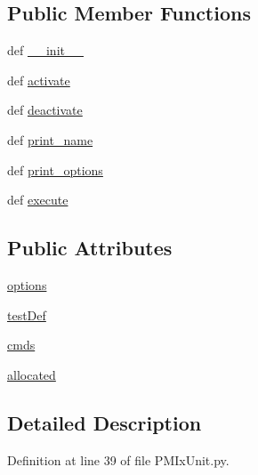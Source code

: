 \subsection*{Public Member Functions}
\begin{DoxyCompactItemize}
\item 
def \hyperlink{class_p_m_ix_unit_1_1_p_m_ix_unit_a01b0f667b854dc0d7051c071d01f2cdb}{\-\_\-\-\_\-init\-\_\-\-\_\-}
\item 
def \hyperlink{class_p_m_ix_unit_1_1_p_m_ix_unit_af9eb3845f804e5cff57f0b96a5c1d912}{activate}
\item 
def \hyperlink{class_p_m_ix_unit_1_1_p_m_ix_unit_a77590898cef9e5d560857e25a00ee287}{deactivate}
\item 
def \hyperlink{class_p_m_ix_unit_1_1_p_m_ix_unit_a64943a4530694aa835f021d0442fc8dd}{print\-\_\-name}
\item 
def \hyperlink{class_p_m_ix_unit_1_1_p_m_ix_unit_a716d70327c8f43718a74e99e87eb05e1}{print\-\_\-options}
\item 
def \hyperlink{class_p_m_ix_unit_1_1_p_m_ix_unit_a692047ba1b5639b1c02f25922cd014bb}{execute}
\end{DoxyCompactItemize}
\subsection*{Public Attributes}
\begin{DoxyCompactItemize}
\item 
\hyperlink{class_p_m_ix_unit_1_1_p_m_ix_unit_a6c56979e7226a414874653b3e7a17dd8}{options}
\item 
\hyperlink{class_p_m_ix_unit_1_1_p_m_ix_unit_a08b01eaf2867a0a02f8598018739e843}{test\-Def}
\item 
\hyperlink{class_p_m_ix_unit_1_1_p_m_ix_unit_a1130f07074aeff223235a147440868c4}{cmds}
\item 
\hyperlink{class_p_m_ix_unit_1_1_p_m_ix_unit_ac5aab2d0bc98a044527305f1dfee7282}{allocated}
\end{DoxyCompactItemize}


\subsection{Detailed Description}


Definition at line 39 of file P\-M\-Ix\-Unit.\-py.



